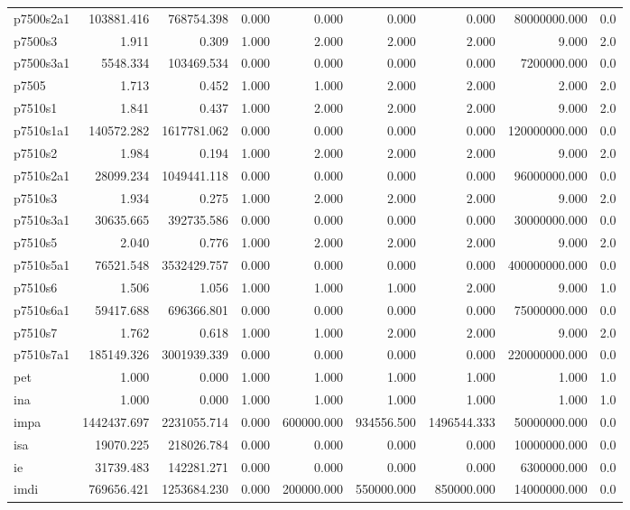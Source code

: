 \begin{longtable}{lrrrrrrrl}
p7500s2a1 & 103881.416 & 768754.398 & 0.000 & 0.000 & 0.000 & 0.000 & 80000000.000 & 0.0 \\
p7500s3 & 1.911 & 0.309 & 1.000 & 2.000 & 2.000 & 2.000 & 9.000 & 2.0 \\
p7500s3a1 & 5548.334 & 103469.534 & 0.000 & 0.000 & 0.000 & 0.000 & 7200000.000 & 0.0 \\
p7505 & 1.713 & 0.452 & 1.000 & 1.000 & 2.000 & 2.000 & 2.000 & 2.0 \\
p7510s1 & 1.841 & 0.437 & 1.000 & 2.000 & 2.000 & 2.000 & 9.000 & 2.0 \\
p7510s1a1 & 140572.282 & 1617781.062 & 0.000 & 0.000 & 0.000 & 0.000 & 120000000.000 & 0.0 \\
p7510s2 & 1.984 & 0.194 & 1.000 & 2.000 & 2.000 & 2.000 & 9.000 & 2.0 \\
p7510s2a1 & 28099.234 & 1049441.118 & 0.000 & 0.000 & 0.000 & 0.000 & 96000000.000 & 0.0 \\
p7510s3 & 1.934 & 0.275 & 1.000 & 2.000 & 2.000 & 2.000 & 9.000 & 2.0 \\
p7510s3a1 & 30635.665 & 392735.586 & 0.000 & 0.000 & 0.000 & 0.000 & 30000000.000 & 0.0 \\
p7510s5 & 2.040 & 0.776 & 1.000 & 2.000 & 2.000 & 2.000 & 9.000 & 2.0 \\
p7510s5a1 & 76521.548 & 3532429.757 & 0.000 & 0.000 & 0.000 & 0.000 & 400000000.000 & 0.0 \\
p7510s6 & 1.506 & 1.056 & 1.000 & 1.000 & 1.000 & 2.000 & 9.000 & 1.0 \\
p7510s6a1 & 59417.688 & 696366.801 & 0.000 & 0.000 & 0.000 & 0.000 & 75000000.000 & 0.0 \\
p7510s7 & 1.762 & 0.618 & 1.000 & 1.000 & 2.000 & 2.000 & 9.000 & 2.0 \\
p7510s7a1 & 185149.326 & 3001939.339 & 0.000 & 0.000 & 0.000 & 0.000 & 220000000.000 & 0.0 \\
pet & 1.000 & 0.000 & 1.000 & 1.000 & 1.000 & 1.000 & 1.000 & 1.0 \\
ina & 1.000 & 0.000 & 1.000 & 1.000 & 1.000 & 1.000 & 1.000 & 1.0 \\
impa & 1442437.697 & 2231055.714 & 0.000 & 600000.000 & 934556.500 & 1496544.333 & 50000000.000 & 0.0 \\
isa & 19070.225 & 218026.784 & 0.000 & 0.000 & 0.000 & 0.000 & 10000000.000 & 0.0 \\
ie & 31739.483 & 142281.271 & 0.000 & 0.000 & 0.000 & 0.000 & 6300000.000 & 0.0 \\
imdi & 769656.421 & 1253684.230 & 0.000 & 200000.000 & 550000.000 & 850000.000 & 14000000.000 & 0.0 \\

\end{longtable}
